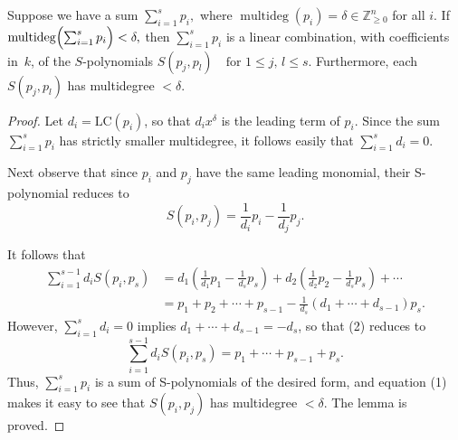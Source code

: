 \begin{lemma}\label{lem:sPolynomial_decomposition} %
    \mathlibok
    Suppose we have a sum $\sum_{i=1}^s p_i,$ where $\operatorname{multideg}(p_i)=\delta\in\mathbb Z_{\ge0}^n$ for all $i$.
    If $\operatorname{multideg}\Bigl(\sum_{i=1}^s p_i\Bigr)<\delta,$ then $\sum_{i=1}^s p_i$ is a linear combination, with coefficients in~$k$, of the $S$-polynomials $S(p_j,p_l)\quad\text{for }1\le j,\,l\le s$.
    Furthermore, each $S(p_j,p_l)$ has multidegree $<\delta$.
\end{lemma}
\begin{proof}
  \mathlibok
  Let $d_i = \text{LC}(p_i)$, so that $d_i x^\delta$ is the leading term of $p_i$. Since the sum $\sum_{i=1}^s p_i$ has strictly smaller multidegree, it follows easily that $\sum_{i=1}^s d_i = 0$.

  Next observe that since $p_i$ and $p_j$ have the same leading monomial, their S-polynomial reduces to
  \begin{equation} \tag{1}
  S(p_i, p_j) = \frac{1}{d_i}p_i - \frac{1}{d_j}p_j.
  \end{equation}

  It follows that
  \begin{equation} \tag{2}
  \begin{aligned}
  \sum_{i=1}^{s-1} d_i S(p_i, p_s) &= d_1\left(\frac{1}{d_1}p_1 - \frac{1}{d_s}p_s\right) + d_2\left(\frac{1}{d_2}p_2 - \frac{1}{d_s}p_s\right) + \cdots \\
  &= p_1 + p_2 + \cdots + p_{s-1} - \frac{1}{d_s}(d_1 + \cdots + d_{s-1})p_s.
  \end{aligned}
  \end{equation}
  However, $\sum_{i=1}^s d_i = 0$ implies $d_1 + \cdots + d_{s-1} = -d_s$, so that (2) reduces to
  \[
  \sum_{i=1}^{s-1} d_i S(p_i, p_s) = p_1 + \cdots + p_{s-1} + p_s.
  \]
  Thus, $\sum_{i=1}^s p_i$ is a sum of S-polynomials of the desired form, and equation (1) makes it easy to see that $S(p_i, p_j)$ has multidegree $<\delta$. The lemma is proved.
\end{proof}

